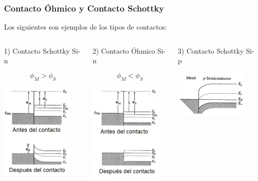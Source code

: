 \documentclass[10pt,t,aspectratio=169]{beamer}
\begin{document}
\begin{frame}[t]
    \frametitle{Contacto Óhmico y Contacto Schottky}

    Los siguientes son ejemplos de los tipos de contactos:

    \vspace{3mm}
    \begin{columns}
        \begin{column}{0.33\textwidth}
            1) Contacto Schottky Si-n
            
            \[\boxed{\phi_M > \phi_S}\]

            \centering
            \includegraphics[width=3.5cm]{./figures/contactos1.png}
        \end{column}
        \begin{column}{0.33\textwidth}
            2) Contacto Óhmico Si-n
            
            \[\boxed{\phi_M < \phi_S}\]

            \centering
            \includegraphics[width=3.5cm]{./figures/contactos2.png}
        \end{column}
        \begin{column}{0.33\textwidth}
            3) Contacto Schottky Si-p

            \centering
            \includegraphics[width=3.5cm]{./figures/contactos3.png}


\end{column}
\end{columns}
\end{frame}
\end{document}
